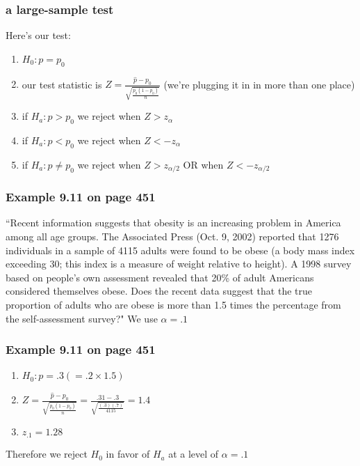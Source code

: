 \documentclass{beamer}
\begin{document}
\begin{frame}
\frametitle{a large-sample test}

Here's our test:

\begin{enumerate}
\item $H_0: p = p_0$
\item our test statistic is $Z = \frac{\hat{p} - p_0}{\sqrt{\frac{p_0(1-p_0)}{n}}}$ (we're plugging it in in more than one place)
\item if $H_a: p > p_0$ we reject when $Z > z_{\alpha}$
\item if $H_a: p < p_0$ we reject when $Z < -z_{\alpha}$
\item if $H_a: p \neq p_0$ we reject when $Z > z_{\alpha/2}$ OR when $Z < -z_{\alpha/2}$
\end{enumerate}

\end{frame}


\begin{frame}
\frametitle{Example 9.11 on page 451}

``Recent information suggests that obesity is an increasing problem in America among all age groups. The Associated Press (Oct. 9, 2002) reported that 1276 individuals in a sample of 4115 adults were found to be obese (a body mass index exceeding 30; this index is a measure of weight relative to height). A 1998 survey based on people's own assessment revealed that 20\% of adult Americans considered themselves obese. Does the recent data suggest that the true proportion of adults who are obese is more than 1.5 times the percentage from the self-assessment survey?" We use $\alpha = .1$



\end{frame}

\begin{frame}
\frametitle{Example 9.11 on page 451}

\begin{enumerate}
\item $H_0: p = .3 ( = .2 \times 1.5)$
\item $Z = \frac{\hat{p} - p_0}{\sqrt{\frac{p_0(1-p_0)}{n}}} = \frac{.31 - .3}{\sqrt{\frac{(.3)(.7)}{4115}}} = 1.4$
\item $z_{.1} = 1.28$
\end{enumerate}

Therefore we reject $H_0$ in favor of $H_a$ at a level of $\alpha = .1$
\end{frame}
\end{document}
